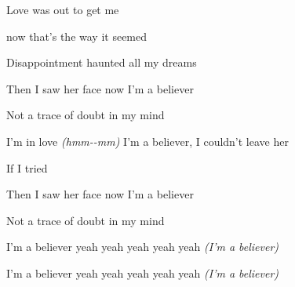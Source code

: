\begin{song}
\bigskip

    \par
{}    \par
{} Love was out to get me  \par
{} now that's the way it seemed  \par
{} Disappointment haunted all my dreams  \par

\bigskip

Then I saw her face   now I'm a believer   \par
Not a trace   of doubt in my mind   \par
I'm in love \textit{(hmm-}\textit{-mm)} I'm a believer, I couldn't leave her \par
If I tried \par

\bigskip

 \par
Then I saw her face   now I'm a believer   \par
Not a trace   of doubt in my mind   \par
I’m a believer yeah yeah yeah yeah yeah \textit{(I’m a be}\textit{liever)}   \par
I’m a believer yeah yeah yeah yeah yeah \textit{(I’m a be}\textit{liever)}   \par
{} \par

\end{song}